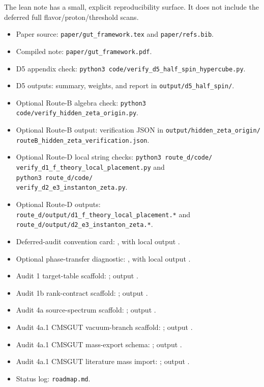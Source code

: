 \documentclass[
  aps,
  prd,
  preprint,
  nofootinbib,
  superscriptaddress,
  longbibliography
]{revtex4-2}
\begin{document}
The lean note has a small, explicit reproducibility surface.  It does not
include the deferred full flavor/proton/threshold scans.
\begin{itemize}
\item Paper source: \texttt{paper/gut\_framework.tex} and
\texttt{paper/refs.bib}.
\item Compiled note: \texttt{paper/gut\_framework.pdf}.
\item D5 appendix check:
\texttt{python3 code/verify\_d5\_half\_spin\_hypercube.py}.
\item D5 outputs: summary, weights, and report in
\texttt{output/d5\_half\_spin/}.
\item Optional Route-B algebra check:
\texttt{python3 code/verify\_hidden\_zeta\_origin.py}.
\item Optional Route-B output: verification JSON in
\texttt{output/hidden\_zeta\_origin/}\\
\texttt{routeB\_hidden\_zeta\_verification.json}.
\item Optional Route-D local string checks:
\texttt{python3 route\_d/code/}\\
\texttt{verify\_d1\_f\_theory\_local\_placement.py}
and\\
\texttt{python3 route\_d/code/}\\
\texttt{verify\_d2\_e3\_instanton\_zeta.py}.
\item Optional Route-D outputs:
\texttt{route\_d/output/d1\_f\_theory\_local\_placement.*} and
\texttt{route\_d/output/d2\_e3\_instanton\_zeta.*}.
\item Deferred-audit convention card:
, with local output
.
\item Optional phase-transfer diagnostic:
, with local output
.
\item Audit 1 target-table scaffold:
; output
.
\item Audit 1b rank-contract scaffold:
; output
.
\item Audit 4a source-spectrum scaffold:
; output
.
\item Audit 4a.1 CMSGUT vacuum-branch scaffold:
; output
.
\item Audit 4a.1 CMSGUT mass-export schema:
; output
.
\item Audit 4a.1 CMSGUT literature mass import:
; output
.
\item Status log: \texttt{roadmap.md}.
\end{itemize}
\end{document}

